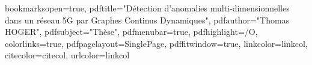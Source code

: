 \hypersetup
{
bookmarksopen=true,
pdftitle="Détection d’anomalies multi-dimensionnelles dans un réseau 5G par Graphes Continus Dynamiques",
pdfauthor="Thomas HOGER", %
pdfsubject="Thèse", %
pdfmenubar=true, %
pdfhighlight=/O, %
colorlinks=true, %
pdfpagelayout=SinglePage, %
pdffitwindow=true, %
linkcolor=linkcol, %
citecolor=citecol, %
urlcolor=linkcol %
}


\setcounter{secnumdepth}{3}
\setcounter{tocdepth}{2}


\newcommand{\pd}[2]{\frac{\partial #1}{\partial #2}}
\def\abs{\operatorname{abs}}
\def\argmax{\operatornamewithlimits{arg\,max}}
\def\argmin{\operatornamewithlimits{arg\,min}}
\def\diag{\operatorname{Diag}}
\newcommand{\eqRef}[1]{(\ref{#1})}

\usepackage{rotating}                    %
\usepackage{fancyhdr}                    %

  

\pagestyle{fancy}                       %
\fancyfoot{}                            %



